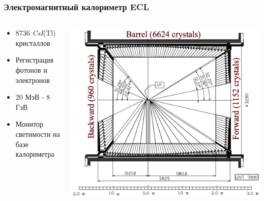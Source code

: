 \documentclass{beamer}
\begin{document}
\begin{frame}
\frametitle{Электромагнитный калориметр ECL}
  \begin{columns}
    \begin{column}{0.5\textwidth}
      \begin{itemize}
        \item 8736 \textit{CsI}(Tl) кристаллов
        \item Регистрация фотонов и электронов
        \item 20 МэВ - 8 ГэВ
        \item Монитор светимости на базе калориметра
      \end{itemize}
    \end{column}
    \begin{column}{0.5\textwidth}
      \includegraphics[width=\textwidth]{ECL}
    \end{column}
  \end{columns}
\end{frame}
\end{document}
